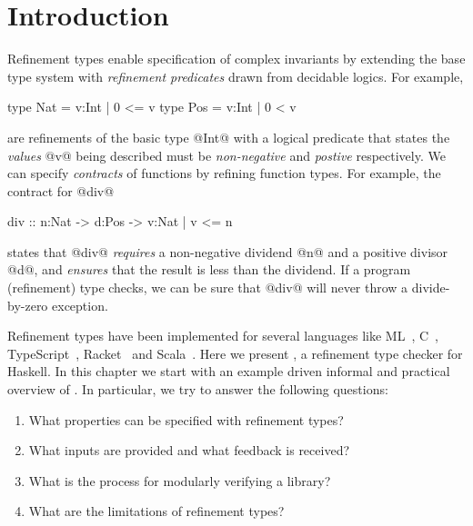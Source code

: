 \section{Introduction}\label{sec:introduction}

Refinement types enable specification of complex invariants 
by extending the base type system with \emph{refinement predicates} 
drawn from decidable logics. For example,
%
\begin{code}
  type Nat = {v:Int | 0 <= v}
  type Pos = {v:Int | 0 < v}
\end{code}
%
are refinements of the basic type @Int@ with a logical predicate 
that states the \emph{values} @v@ being described must be 
\emph{non-negative} and \emph{postive} respectively. 
%
We can specify \emph{contracts} of functions by refining function types. 
For example, the contract for @div@
%
\begin{code}
  div :: n:Nat -> d:Pos -> {v:Nat | v <= n}
\end{code}
%
states that @div@ \emph{requires} a non-negative dividend @n@ and a positive
divisor @d@, and \emph{ensures} that the result is less than the dividend.
%
If a program (refinement) type checks, we can be sure that @div@ will never 
throw a divide-by-zero exception.

Refinement types \citep{ConstableS87,Rushby98} 
have been implemented for several languages like
ML~\cite{pfenningxi98,GordonRefinement09,LiquidPLDI08},
C~\cite{deputy,LiquidPOPL10},
TypeScript~\cite{Vekris16},
Racket~\cite{RefinedRacket} and Scala~\cite{refinedscala}.
%
Here we present \toolname,
a refinement type checker for Haskell.
%
In this chapter we start with an example driven informal and practical overview
of \toolname.
%
In particular, we try to answer the following questions:
%
\begin{enumerate}
  \item What properties can be specified with refinement types?
  \item What inputs are provided and what feedback is received?
  \item What is the process for modularly verifying a library?
  \item What are the limitations of refinement types? 
\end{enumerate}

